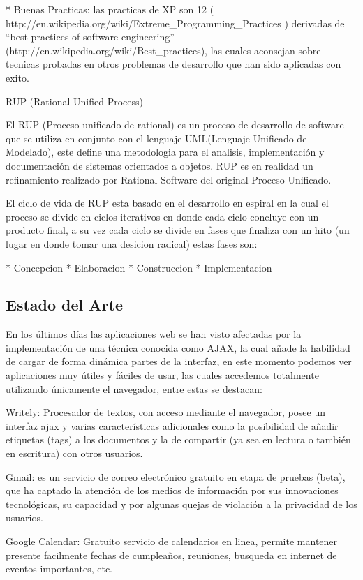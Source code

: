 * Buenas Practicas: las practicas de XP son 12 ( http://en.wikipedia.org/wiki/Extreme_Programming_Practices ) derivadas de ``best practices of software engineering'' (http://en.wikipedia.org/wiki/Best_practices), las cuales aconsejan sobre tecnicas probadas en otros problemas de desarrollo que han sido aplicadas con exito.



RUP (Rational Unified Process)

El RUP (Proceso unificado de rational) es un proceso de desarrollo de software que se utiliza en conjunto con el lenguaje UML(Lenguaje Unificado de Modelado), este define una metodologia para el analisis, implementación y documentación de sistemas orientados a objetos. RUP es en realidad un refinamiento realizado por Rational Software del original Proceso Unificado.

El ciclo de vida de RUP esta basado en el desarrollo en espiral en la cual el proceso se divide en ciclos iterativos en donde cada ciclo concluye con un producto final, a su vez cada ciclo se divide en fases que finaliza con un hito (un lugar en donde tomar una desicion radical) estas fases son: 

* Concepcion
* Elaboracion
* Construccion
* Implementacion

\subsection{Estado del Arte}

En los últimos días las aplicaciones web se han visto afectadas por la implementación de una técnica conocida como AJAX, la cual añade la habilidad de cargar de forma dinámica partes de la interfaz, en este momento podemos ver aplicaciones muy útiles y fáciles de usar, las cuales accedemos totalmente utilizando únicamente el navegador, entre estas se destacan:

Writely: Procesador de textos, con acceso mediante el navegador, posee un interfaz ajax y varias características adicionales como la posibilidad de añadir etiquetas (tags) a los documentos y la de compartir (ya sea en lectura o también en escritura) con otros usuarios.

Gmail: es un servicio de correo electrónico gratuito en etapa de pruebas (beta), que ha captado la atención de los medios de información por sus innovaciones tecnológicas, su capacidad y por algunas quejas de violación a la privacidad de los usuarios.

Google Calendar: Gratuito servicio de calendarios en linea, permite mantener presente facilmente fechas de cumpleaños, reuniones, busqueda en internet de eventos importantes, etc.


